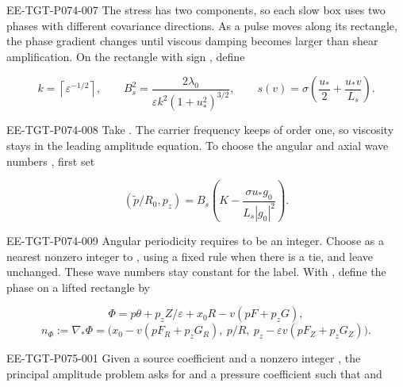 \begin{EESegment}{EE-TGT-P074-007}
The stress has two components, so each slow box uses two phases with different covariance directions. As a pulse moves along its rectangle, the phase gradient changes until viscous damping becomes larger than shear amplification. On the rectangle with sign , define
\end{EESegment}
\begin{equation}
k=\left\lceil\varepsilon^{-1/2}\right\rceil,\qquad
B_s^2=\frac{2\lambda_0}{\varepsilon k^2(1+u_*^2)^{3/2}},\qquad
s(v)=\sigma\left(\frac{u_*}{2}+\frac{u_*v}{L_s}\right).
\tag{7.2}\label{eq:7.2}
\end{equation}
\begin{EESegment}{EE-TGT-P074-008}
Take . The carrier frequency  keeps  of order one, so viscosity stays in the leading amplitude equation. To choose the angular and axial wave numbers , first set
\end{EESegment}
\[
(\widetilde p/R_0,p_z)=B_s\left(K-\frac{\sigma u_*g_0}{L_s|g_0|^2}\right).
\]
\begin{EESegment}{EE-TGT-P074-009}
Angular periodicity requires  to be an integer. Choose  as a nearest nonzero integer to , using a fixed rule when there is a tie, and leave  unchanged. These wave numbers stay constant for the label. With , define the phase on a lifted rectangle by
\end{EESegment}
\begin{equation}
\Phi=p\theta+p_zZ/\varepsilon+x_0R-v(pF+p_zG),
\tag{7.3}\label{eq:7.3}
\end{equation}
\begin{equation}
n_\Phi:=\nabla_*\Phi=\bigl(x_0-v(pF_R+p_zG_R),\ p/R,\ p_z-\varepsilon v(pF_Z+p_zG_Z)\bigr).
\tag{7.4}\label{eq:7.4}
\end{equation}
\begin{EESegment}{EE-TGT-P075-001}
Given a source coefficient  and a nonzero integer , the principal amplitude problem asks for  and a pressure coefficient  such that  and
\end{EESegment}
